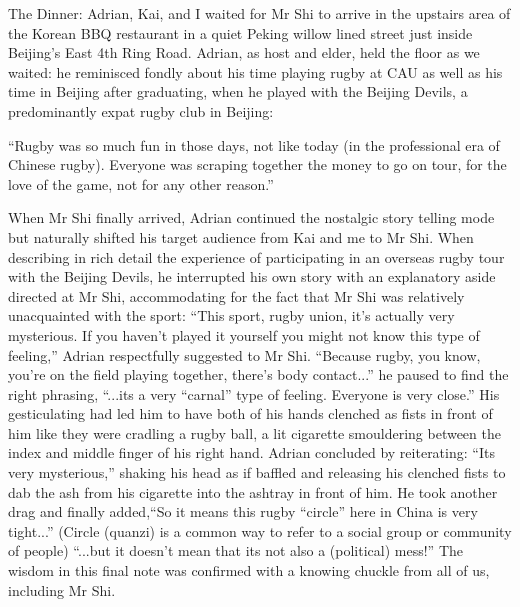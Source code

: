 The Dinner:
Adrian, Kai, and I waited for Mr Shi to arrive in the upstairs area of the Korean BBQ restaurant in a quiet Peking willow lined street just inside Beijing's East 4th Ring Road.  Adrian, as host and elder, held the floor as we waited: he reminisced fondly about his time playing rugby at CAU as well as his time in Beijing after graduating, when he played with the Beijing Devils, a predominantly expat rugby club in Beijing:

  ``Rugby was so much fun in those days, not like today (in the professional era of Chinese rugby).  Everyone was scraping together the money to go on tour, for the love of the game, not for any other reason.''

When Mr Shi finally arrived, Adrian continued the nostalgic story telling mode but naturally shifted his target audience from Kai and me to Mr Shi.  When describing in rich detail the experience of participating in an overseas rugby tour with the Beijing Devils, he interrupted his own story with an explanatory aside directed at Mr Shi, accommodating for the fact that Mr Shi was relatively unacquainted with the sport: ``This sport, rugby union, it's actually very mysterious. If you haven't played it yourself you might not know this type of feeling,'' Adrian respectfully suggested to Mr Shi. ``Because rugby, you know, you're on the field playing together, there's body contact...'' he paused to find the right phrasing,  ``...its a very ``carnal'' type of feeling. Everyone is very close.'' His gesticulating had led him to have both of his hands clenched as fists in front of him like they were cradling a rugby ball, a lit cigarette smouldering between the index and middle finger of his right hand.  Adrian concluded by reiterating: ``Its very mysterious,'' shaking his head as if baffled and releasing his clenched fists to dab the ash from his cigarette into the ashtray in front of him. He took another drag and   finally added,``So it means this rugby ``circle'' here in China is very tight...'' (Circle (quanzi) is a common way to refer to a social group or community of people) ``...but it doesn't mean that its not also a (political) mess!'' The wisdom in this final note was confirmed with a knowing chuckle from all of us, including Mr Shi.


